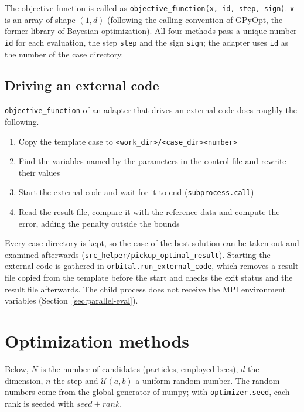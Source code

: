 \documentclass[11pt,a4paper]{article}
\begin{document}
The objective function is called as \texttt{objective\_function(x, id, step, sign)}. \texttt{x} is an array of shape $(1, d)$ (following the calling convention of GPyOpt, the former library of Bayesian optimization). All four methods pass a unique number \texttt{id} for each evaluation, the step \texttt{step} and the sign \texttt{sign}; the adapter uses \texttt{id} as the number of the case directory.

\subsection{Driving an external code}

\texttt{objective\_function} of an adapter that drives an external code does roughly the following.

\begin{enumerate}
\item Copy the template case to \texttt{<work\_dir>/<case\_dir><number>}
\item Find the variables named by the parameters in the control file and rewrite their values
\item Start the external code and wait for it to end (\texttt{subprocess.call})
\item Read the result file, compare it with the reference data and compute the error, adding the penalty outside the bounds
\end{enumerate}

Every case directory is kept, so the case of the best solution can be taken out and examined afterwards (\texttt{src\_helper/pickup\_optimal\_result}). Starting the external code is gathered in \texttt{orbital.run\_external\_code}, which removes a result file copied from the template before the start and checks the exit status and the result file afterwards. The child process does not receive the MPI environment variables (Section~\ref{sec:parallel-eval}).

\section{Optimization methods}\label{sec:methods}

Below, $N$ is the number of candidates (particles, employed bees), $d$ the dimension, $n$ the step and $\mathcal{U}(a,b)$ a uniform random number. The random numbers come from the global generator of numpy; with \texttt{optimizer.seed}, each rank is seeded with $\mathit{seed} + \mathit{rank}$.
\end{document}
